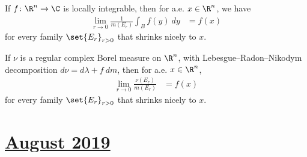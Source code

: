 \documentclass[10pt]{mypackage}
\begin{document}
\begin{theorem}
  If $f\colon \R^n\rightarrow \C$ is locally integrable, then for a.e. $x\in \R^n$, we have
  \begin{align*}
    \lim_{r\rightarrow 0} \frac{1}{m\left(E_r\right)} \int_{B}^{} f(y)\:dy &= f(x)
  \end{align*}
  for every family $\set{E_r}_{r > 0}$ that shrinks nicely to $x$.
\end{theorem}
\begin{corollary}
  If $\nu$ is a regular complex Borel measure on $\R^n$, with Lebesgue--Radon--Nikodym decomposition $d\nu = d\lambda + f\:dm$, then for a.e. $x\in \R^n$,
  \begin{align*}
    \lim_{r\rightarrow 0} \frac{\nu\left( E_r \right)}{m\left( E_r \right)} &= f(x)
  \end{align*}
  for every family $\set{E_r}_{r > 0}$ that shrinks nicely to $x$.
\end{corollary}

\section{\href{https://math.virginia.edu/graduate/exams/analysis/2019Aug_real.pdf}{August 2019}}%
\end{document}
